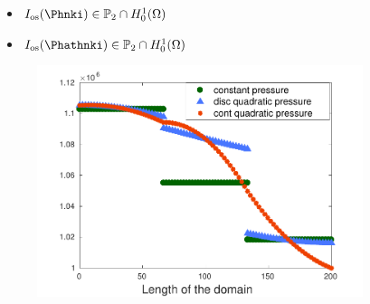 \documentclass[10 pt]{beamer}
\begin{document}
\begin{frame}
\begin{minipage}{.5 \linewidth}
\begin{itemize}
\item $I_{\mathrm{os}}(\Phnki) \in \mathbb{P}_2 \cap H_0^1(\Omega)$\\
\item  $I_{\mathrm{os}}(\Phathnki) \in \mathbb{P}_2 \cap H_0^1(\Omega)$ 
\end{itemize}
\end{minipage}
\hfill
\begin{minipage}{.45 \linewidth}
\begin{figure}
\hspace{0.6 cm}
\includegraphics[width=0.85\textwidth]{image/modif_image_post_process_cont}   
\end{figure}
\end{minipage}
\end{frame}
\end{document}

